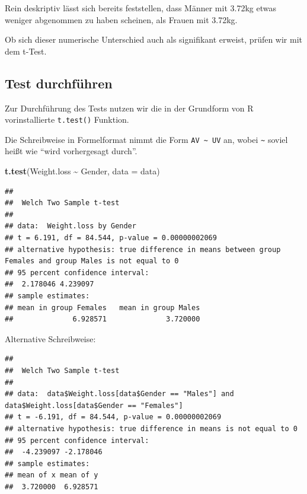 \documentclass[
]{book}
\newenvironment{Shaded}{\begin{snugshade}}{\end{snugshade}}
\newcommand{\AttributeTok}[1]{\textcolor[rgb]{0.13,0.29,0.53}{#1}}
\newcommand{\FunctionTok}[1]{\textcolor[rgb]{0.13,0.29,0.53}{\textbf{#1}}}
\newcommand{\NormalTok}[1]{#1}
\newcommand{\SpecialCharTok}[1]{\textcolor[rgb]{0.81,0.36,0.00}{\textbf{#1}}}
\newcommand{\StringTok}[1]{\textcolor[rgb]{0.31,0.60,0.02}{#1}}
\begin{document}
Rein deskriptiv lässt sich bereits feststellen, dass Männer mit 3.72kg etwas weniger abgenommen zu haben scheinen, als Frauen mit 3.72kg.

Ob sich dieser numerische Unterschied auch als signifikant erweist, prüfen wir mit dem t-Test.

\subsection{Test durchführen}\label{test-durchfuxfchren-1}

Zur Durchführung des Tests nutzen wir die in der Grundform von R vorinstallierte \texttt{t.test()} Funktion.

Die Schreibweise in Formelformat nimmt die Form \texttt{AV\ \textasciitilde{}\ UV} an, wobei \texttt{\textasciitilde{}} soviel heißt wie ``wird vorhergesagt durch''.

\begin{Shaded}
\begin{Highlighting}[]
\FunctionTok{t.test}\NormalTok{(Weight.loss }\SpecialCharTok{\textasciitilde{}}\NormalTok{ Gender, }\AttributeTok{data =}\NormalTok{ data)}
\end{Highlighting}
\end{Shaded}

\begin{verbatim}
## 
##  Welch Two Sample t-test
## 
## data:  Weight.loss by Gender
## t = 6.191, df = 84.544, p-value = 0.00000002069
## alternative hypothesis: true difference in means between group Females and group Males is not equal to 0
## 95 percent confidence interval:
##  2.178046 4.239097
## sample estimates:
## mean in group Females   mean in group Males 
##              6.928571              3.720000
\end{verbatim}

Alternative Schreibweise:

\begin{Shaded}
\end{Shaded}

\begin{verbatim}
## 
##  Welch Two Sample t-test
## 
## data:  data$Weight.loss[data$Gender == "Males"] and data$Weight.loss[data$Gender == "Females"]
## t = -6.191, df = 84.544, p-value = 0.00000002069
## alternative hypothesis: true difference in means is not equal to 0
## 95 percent confidence interval:
##  -4.239097 -2.178046
## sample estimates:
## mean of x mean of y 
##  3.720000  6.928571
\end{verbatim}
\end{document}
